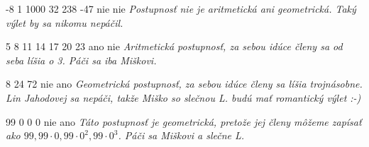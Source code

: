 -8 1 1000 32 238 -47
\vystup
nie
nie
\koniec
\textsl{Postupnosť nie je aritmetická ani geometrická. Taký výlet by sa nikomu nepáčil.}

5 8 11 14 17 20 23
\vystup
ano
nie
\koniec
\textsl{Aritmetická postupnosť, za sebou idúce členy sa od seba líšia o 3. Páči sa iba Miškovi.}

8 24 72
\vystup
nie
ano
\koniec
\textsl{Geometrická postupnosť, za sebou idúce členy sa líšia trojnásobne. Lin Jahodovej sa nepáči, takže Miško so slečnou L. budú mať romantický výlet :-)}

99 0 0 0
\vystup
nie
ano
\koniec
\textsl{Táto postupnosť je geometrická, pretože jej členy môžeme zapísať ako $99, 99\cdot{}0, 99\cdot{}0^{2}, 99\cdot{}0^{3}$. Páči sa Miškovi a slečne L.}

